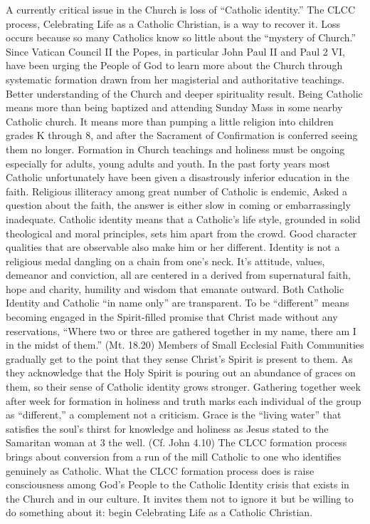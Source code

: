 \documentclass{article}        %
\begin{document}
A currently critical issue in the Church is loss of ``Catholic identity.'' The
CLCC process, Celebrating Life as a Catholic Christian, is a way to recover
it. Loss occurs because so many Catholics know so little about the ``mystery of
Church.'' Since Vatican Council II the Popes, in particular John Paul II and
Paul
2
VI, have been urging the People of God to learn more about the Church through
systematic formation drawn from her magisterial and authoritative
teachings. Better understanding of the Church and deeper spirituality result.
Being Catholic means more than being baptized and attending Sunday Mass in some
nearby Catholic church. It means more than pumping a little religion into
children grades K through 8, and after the Sacrament of Confirmation is
conferred seeing them no longer. Formation in Church teachings and holiness must
be ongoing especially for adults, young adults and youth. In the past forty
years most Catholic unfortunately have been given a disastrously inferior
education in the faith. Religious illiteracy among great number of Catholic is
endemic, Asked a question about the faith, the answer is either slow in coming
or embarrassingly inadequate.
Catholic identity means that a Catholic's life style, grounded in solid
theological and moral principles, sets him apart from the crowd. Good character
qualities that are observable also make him or her different. Identity is not a
religious medal dangling on a chain from one's neck. It's attitude, values,
demeanor and conviction, all are centered in a derived from supernatural faith,
hope and charity, humility and wisdom that emanate outward. Both Catholic
Identity and Catholic ``in name only'' are transparent.
To be ``different'' means becoming engaged in the Spirit-filled promise that
Christ made without any reservations, ``Where two or three are gathered together
in my name, there am I in the midst of them.'' (Mt. 18.20) Members of Small
Ecclesial Faith Communities gradually get to the point that they sense Christ's
Spirit is present to them. As they acknowledge that the Holy Spirit is pouring
out an abundance of graces on them, so their sense of Catholic identity grows
stronger. Gathering together week after week for formation in holiness and truth
marks each individual of the group as ``different,'' a complement not a
criticism.
Grace is the ``living water'' that satisfies the soul's thirst for knowledge and
holiness as Jesus stated to the Samaritan woman at
3
the well. (Cf. John 4.10) The CLCC formation process brings about conversion
from a run of the mill Catholic to one who identifies genuinely as
Catholic. What the CLCC formation process does is raise consciousness among
God's People to the Catholic Identity crisis that exists in the Church and in
our culture. It invites them not to ignore it but be willing to do something
about it: begin Celebrating Life as a Catholic Christian.
\end{document}
